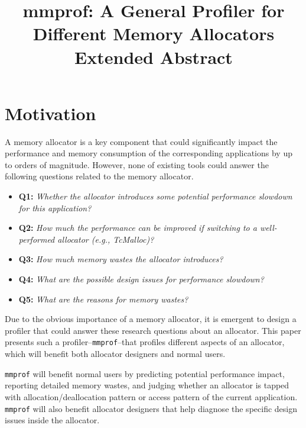 \documentclass[pageno]{jpaper}
\newcommand{\MP}{\texttt{mmprof}}
\begin{document}
\title{mmprof: A General Profiler for Different Memory Allocators\\ \textbf{Extended Abstract}}

\date{}

\maketitle



\section{Motivation}
\label{sec:motivation}

A memory allocator is a key component that could significantly impact the performance and memory consumption of the corresponding applications by up to orders of magnitude. However, none of existing tools could answer the following questions related to the memory allocator. \\

\begin{itemize}
\item \textbf{Q1:} \textit{Whether the allocator introduces some potential performance slowdown for this application? }
\item \textbf{Q2:} \textit{How much the performance can be improved if switching to a well-performed allocator (e.g., TcMalloc)?}
\item \textbf{Q3:} \textit{How much memory wastes the allocator introduces?}
\item \textbf{Q4:} \textit{What are the possible design issues for performance slowdown?}
\item \textbf{Q5:} \textit{What are the reasons for memory wastes?} 
\end{itemize}
\vspace{0.1in}

Due to the obvious importance of a memory allocator, it is emergent to design a profiler that could answer these research questions about an allocator. This paper presents such a profiler--\MP{}--that profiles different aspects of an allocator, which will benefit both allocator designers and normal users. 

\MP{} will benefit normal users by predicting potential performance impact, reporting detailed memory wastes, and judging whether an allocator is tapped with allocation/deallocation pattern or access pattern of the current application. \MP{} will also benefit allocator designers that help diagnose the specific design issues inside the allocator. 
\end{document}
